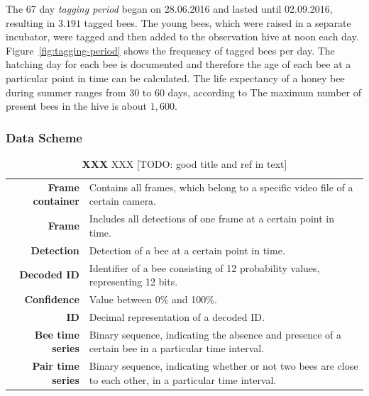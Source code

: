 The 67 day \emph{tagging period} began on 28.06.2016 and lasted until 02.09.2016, resulting in $3.191$ tagged bees.
The young bees, which were raised in a separate incubator, were tagged and then added to the observation hive at noon each day.
Figure~\ref{fig:tagging-period} shows the frequency of tagged bees per day.
The hatching day for each bee is documented and therefore the age of each bee at a particular point in time can be calculated.
The life expectancy of a honey bee during summer ranges from 30 to 60 days, according to \textcite[p. 27]{menzel2016intelligenz}
The maximum number of present bees in the hive is about $1,600$.

\subsubsection{Data Scheme}
\label{subsec:datascheme}

\begin{table}[!t]
\small
\caption[X]{\textbf{XXX} XXX [TODO: good title and ref in text]}
\label{tab:dataset}
\colorbox{usethiscolorhere}{
\centering
\begin{tabularx}{\textwidth}{@{} r Y @{}}
	\textbf{Frame container} &
	Contains all frames, which belong to a specific video file of a certain camera.\\
	\textbf{Frame} &
	Includes all detections of one frame at a certain point in time.\\
	\textbf{Detection} &
	Detection of a bee at a certain point in time.\\
	\textbf{Decoded ID} &
	Identifier of a bee consisting of 12 probability values, representing 12 bits.\\
	\textbf{Confidence} &
	Value between 0\% and 100\%.\\
	\textbf{ID} &
	Decimal representation of a decoded ID.\\
	\textbf{Bee time series} & Binary sequence, indicating the absence and presence of a certain bee in a particular time interval.\\
	\textbf{Pair time series} & Binary sequence, indicating whether or not two bees are close to each other, in a particular time interval.\\
\end{tabularx}
}
\end{table}

